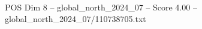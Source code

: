 \begin{textsample}{POS Dim 8 – global\_north\_2024\_07 – Score 4.00 – global\_north\_2024\_07/110738705.txt}
\end{textsample}
